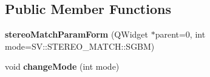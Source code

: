 \subsection*{Public Member Functions}
\begin{DoxyCompactItemize}
\item 
\hypertarget{classstereo_match_param_form_a723a09ecefd0bc51813c14ea713bf7be}{}{\bfseries stereo\+Match\+Param\+Form} (Q\+Widget $\ast$parent=0, int mode=S\+V\+::\+S\+T\+E\+R\+E\+O\+\_\+\+M\+A\+T\+C\+H\+::\+S\+G\+B\+M)\label{classstereo_match_param_form_a723a09ecefd0bc51813c14ea713bf7be}

\item 
\hypertarget{classstereo_match_param_form_a9efd57f345ef61d269bdefa8fb04cd48}{}void {\bfseries change\+Mode} (int mode)\label{classstereo_match_param_form_a9efd57f345ef61d269bdefa8fb04cd48}

\end{DoxyCompactItemize}
